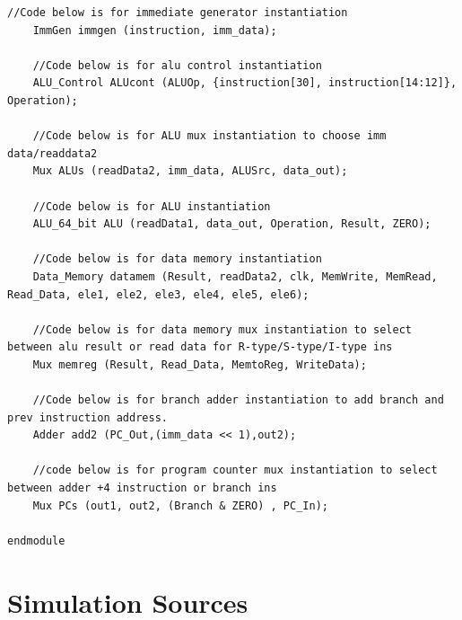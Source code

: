 \documentclass{article}
\begin{document}
\begin{lstlisting}[caption={RISC-V Design Module Code}, captionpos=b, language=RISC-V]
    //Code below is for immediate generator instantiation
    ImmGen immgen (instruction, imm_data);
    
    //Code below is for alu control instantiation
    ALU_Control ALUcont (ALUOp, {instruction[30], instruction[14:12]}, Operation);
    
    //Code below is for ALU mux instantiation to choose imm data/readdata2
    Mux ALUs (readData2, imm_data, ALUSrc, data_out); 
    
    //Code below is for ALU instantiation    
    ALU_64_bit ALU (readData1, data_out, Operation, Result, ZERO);
    
    //Code below is for data memory instantiation
    Data_Memory datamem (Result, readData2, clk, MemWrite, MemRead, Read_Data, ele1, ele2, ele3, ele4, ele5, ele6);
    
    //Code below is for data memory mux instantiation to select between alu result or read data for R-type/S-type/I-type ins   
    Mux memreg (Result, Read_Data, MemtoReg, WriteData); 
    
    //Code below is for branch adder instantiation to add branch and prev instruction address.
    Adder add2 (PC_Out,(imm_data << 1),out2);
    
    //code below is for program counter mux instantiation to select between adder +4 instruction or branch ins
    Mux PCs (out1, out2, (Branch & ZERO) , PC_In); 
    
endmodule  
\end{lstlisting}

\section{Simulation Sources}
\end{document}
